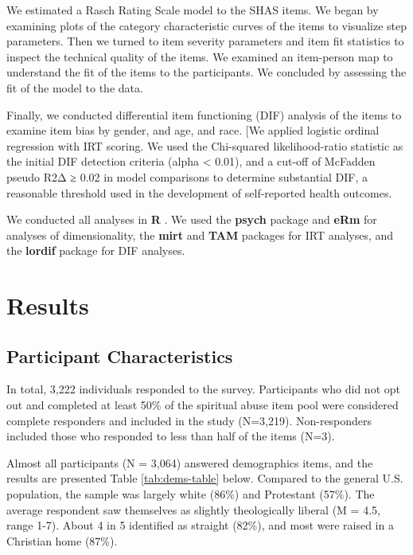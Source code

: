 \documentclass[
]{article}
\begin{document}
We estimated a Rasch Rating Scale model to the SHAS items. We began by examining plots of the category characteristic curves of the items to visualize step parameters. Then we turned to item severity parameters and item fit statistics to inspect the technical quality of the items. We examined an item-person map to understand the fit of the items to the participants. We concluded by assessing the fit of the model to the data.

Finally, we conducted differential item functioning (DIF) analysis of the items to examine item bias by gender, and age, and race. {[}We applied logistic ordinal regression with IRT scoring. We used the Chi-squared likelihood-ratio statistic as the initial DIF detection criteria (alpha \textless{} 0.01), and a cut-off of McFadden pseudo R2Δ ≥ 0.02 in model comparisons to determine substantial DIF, a reasonable threshold used in the development of self-reported health outcomes.

We conducted all analyses in \textbf{R} \citep{R-base}. We used the \textbf{psych} package \citep{R-psych} and \textbf{eRm} \citep{R-eRm} for analyses of dimensionality, the \textbf{mirt} \citep{R-mirt} and \textbf{TAM} \citep{R-TAM} packages for IRT analyses, and the \textbf{lordif} \citep{R-lordif} package for DIF analyses.

\hypertarget{results}{%
\section{Results}\label{results}}

\hypertarget{participant-characteristics}{%
\subsection{Participant Characteristics}\label{participant-characteristics}}

In total, 3,222 individuals responded to the survey. Participants who did not opt out and completed at least 50\% of the spiritual abuse item pool were considered complete responders and included in the study (N=3,219). Non-responders included those who responded to less than half of the items (N=3).

Almost all participants (N = 3,064) answered demographics items, and the results are presented Table \ref{tab:dems-table} below. Compared to the general U.S. population, the sample was largely white (86\%) and Protestant (57\%). The average respondent saw themselves as slightly theologically liberal (M = 4.5, range 1-7). About 4 in 5 identified as straight (82\%), and most were raised in a Christian home (87\%).
\end{document}
